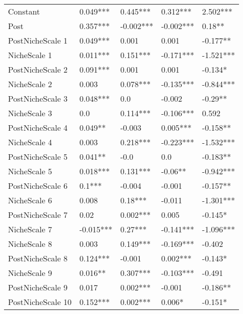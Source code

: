 \begin{longtable}[h!]{lllll}
\bottomrule
\endlastfoot
Constant          &            0.049*** &    0.445*** &   0.312*** &   2.502*** \\
Post              &            0.357*** &   -0.002*** &  -0.002*** &     0.18** \\
PostNicheScale 1  &            0.049*** &       0.001 &      0.001 &   -0.177** \\
NicheScale 1      &            0.011*** &    0.151*** &  -0.171*** &  -1.521*** \\
PostNicheScale 2  &            0.091*** &       0.001 &      0.001 &    -0.134* \\
NicheScale 2      &               0.003 &    0.078*** &  -0.135*** &  -0.844*** \\
PostNicheScale 3  &            0.048*** &         0.0 &     -0.002 &    -0.29** \\
NicheScale 3      &                 0.0 &    0.114*** &  -0.106*** &      0.592 \\
PostNicheScale 4  &             0.049** &      -0.003 &   0.005*** &   -0.158** \\
NicheScale 4      &               0.003 &    0.218*** &  -0.223*** &  -1.532*** \\
PostNicheScale 5  &             0.041** &        -0.0 &        0.0 &   -0.183** \\
NicheScale 5      &            0.018*** &    0.131*** &    -0.06** &  -0.942*** \\
PostNicheScale 6  &              0.1*** &      -0.004 &     -0.001 &   -0.157** \\
NicheScale 6      &               0.008 &     0.18*** &     -0.011 &  -1.301*** \\
PostNicheScale 7  &                0.02 &    0.002*** &      0.005 &    -0.145* \\
NicheScale 7      &           -0.015*** &     0.27*** &  -0.141*** &  -1.096*** \\
NicheScale 8      &               0.003 &    0.149*** &  -0.169*** &     -0.402 \\
PostNicheScale 8  &            0.124*** &      -0.001 &   0.002*** &    -0.143* \\
NicheScale 9      &             0.016** &    0.307*** &  -0.103*** &     -0.491 \\
PostNicheScale 9  &               0.017 &    0.002*** &     -0.001 &   -0.186** \\
PostNicheScale 10 &            0.152*** &    0.002*** &     0.006* &    -0.151* \\

\end{longtable}
